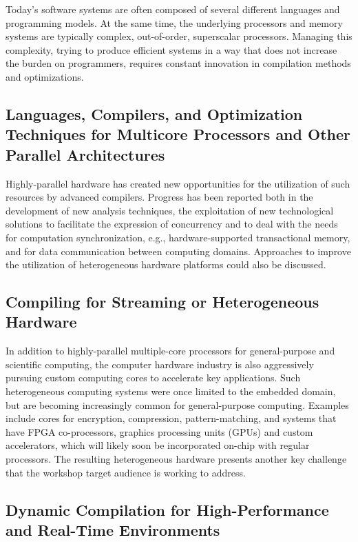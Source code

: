 \documentclass[sigconf]{acmart}
\begin{document}
Today's software systems are often composed of several different languages and programming models. At the same time, the underlying processors and memory systems are typically complex, out-of-order, superscalar processors.  Managing this complexity, trying to produce efficient systems in a way that does not increase the burden on programmers, requires constant innovation in compilation methods and optimizations.

\subsection{Languages, Compilers, and Optimization Techniques for Multicore Processors and Other Parallel Architectures}

Highly-parallel hardware has created new opportunities for the utilization of such resources by advanced compilers. Progress has been reported both in the development of new analysis techniques, the exploitation of new technological solutions to facilitate the expression of concurrency and to deal with the needs for computation synchronization, e.g., hardware-supported transactional memory, and for data communication between computing domains. Approaches to improve the utilization of heterogeneous hardware platforms could also be discussed.

\subsection{Compiling for Streaming or Heterogeneous Hardware}

In addition to highly-parallel multiple-core processors for general-purpose and scientific computing, the computer hardware industry is also aggressively pursuing custom computing cores to accelerate key applications. Such heterogeneous computing systems were once limited to the embedded domain, but are becoming increasingly common for general-purpose computing. Examples include cores for encryption, compression, pattern-matching, and systems that have FPGA co-processors, graphics processing units (GPUs) and custom accelerators, which will likely soon be incorporated on-chip with regular processors. The resulting heterogeneous hardware presents another key challenge that the workshop target audience is working to address.

\subsection{Dynamic Compilation for High-Performance and Real-Time Environments}
\end{document}
